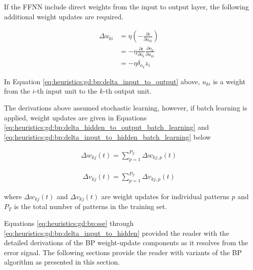 If the \ac{FFNN} include direct weights from the input to output layer, the following additional weight updates are required.

\begin{equation}
    \label{eq:heuristics:gd:bp:delta_input_to_output}
    \begin{split}
        \Delta u_{ki}
        &= \eta \left( - \frac{\partial \epsilon}{\partial u_{ki}} \right)\\
        &= -\eta \frac{\partial \epsilon}{\partial o_{k}} \frac{\partial o_{k}}{\partial u_{ki}}\\
        &= -\eta \delta_{o_{k}}z_{i}
    \end{split}
\end{equation}

In Equation \ref{eq:heuristics:gd:bp:delta_input_to_output} above, $u_{ki}$ is a weight from the $i$-th input unit to the $k$-th output unit.

The derivations above assumed stochastic learning, however, if batch learning is applied, weight updates are given in Equations \ref{eq:heuristics:gd:bp:delta_hidden_to_output_batch_learning} and \ref{eq:heuristics:gd:bp:delta_input_to_hidden_batch_learning} below

\begin{equation}
    \label{eq:heuristics:gd:bp:delta_hidden_to_output_batch_learning}
    \begin{split}
        \Delta w_{kj}(t) = \sum^{P_{T}}_{p=1} \Delta w_{kj,p}(t)
    \end{split}
\end{equation}

\begin{equation}
    \label{eq:heuristics:gd:bp:delta_input_to_hidden_batch_learning}
    \begin{split}
        \Delta v_{kj}(t) = \sum^{P_{T}}_{p=1} \Delta v_{kj,p}(t)
    \end{split}
\end{equation}

where $\Delta w_{kj}(t)$ and $\Delta v_{kj}(t)$ are weight updates for individual patterns $p$ and $P_{T}$ is the total number of patterns in the training set.

Equations \ref{eq:heuristics:gd:bp:sse} through \ref{eq:heuristics:gd:bp:delta_input_to_hidden} provided the reader with the detailed derivations of the \ac{BP} weight-update components as it resolves from the error signal. The following sections provide the reader with variants of the \ac{BP} algorithm as presented in this section.



